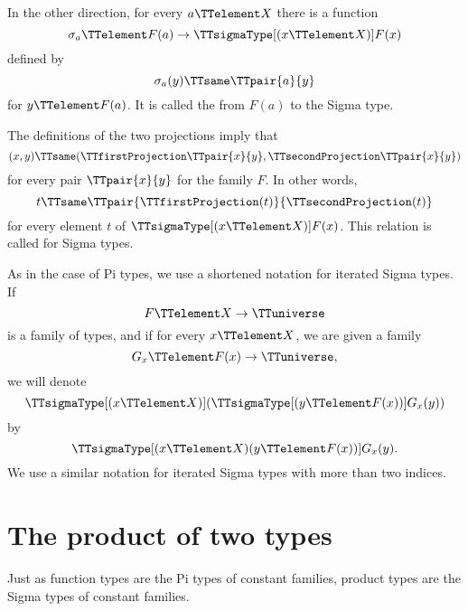 \documentclass{article}
\begin{document}
In the other direction, for every $a \TTelement X$ there is a function
\begin{equation*}
  \sigma_a \TTelement
  F(a) \to \TTsigmaType[(x \TTelement X)] F(x)
\end{equation*}
defined by
\begin{equation*}
  \sigma_a(y) \TTsame \TTpair{a}{y}
\end{equation*}
for $y \TTelement F(a)$.  It is called the  from $F(a)$ to the Sigma type.

The definitions of the two projections imply that
\begin{equation*}
  (x,y) \TTsame
  ( \TTfirstProjection \TTpair{x}{y},
  \TTsecondProjection \TTpair{x}{y} )
\end{equation*}
for every pair $\TTpair{x}{y}$ for the family $F$.  In other words,
\begin{equation*}
  t \TTsame \TTpair{\TTfirstProjection(t)}{\TTsecondProjection(t)}
\end{equation*}
for every element $t$ of $\TTsigmaType[(x \TTelement X)] F(x)$.  This
relation is called  for Sigma types.

As in the case of Pi types, we use a shortened notation for iterated
Sigma types.  If
\begin{equation*}
  F \TTelement X \to \TTuniverse
\end{equation*}
is a family of types, and if for every $x \TTelement X$, we are given
a family
\begin{equation*}
  G_x \TTelement F(x) \to \TTuniverse,
\end{equation*}
we will denote
\begin{equation*}
  \TTsigmaType[(x \TTelement X)]
  (\TTsigmaType[(y \TTelement F(x))] G_x(y))
\end{equation*}
by
\begin{equation*}
  \TTsigmaType[(x \TTelement X) (y \TTelement F(x))] G_x(y).
\end{equation*}
We use a similar notation for iterated Sigma types with more than two
indices.

\section{The product of two types}
\label{sec:product-two-types}

Just as function types are the Pi types of constant families, product
types are the Sigma types of constant families.
\end{document}
